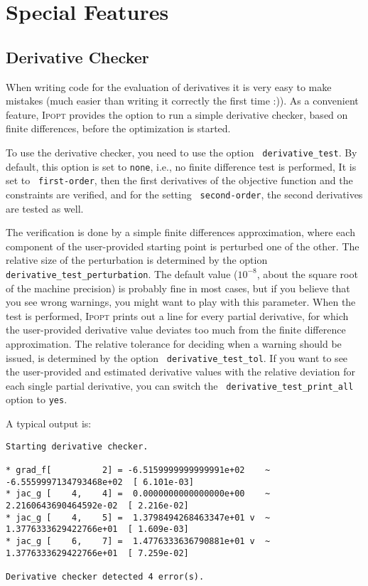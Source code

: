 \documentclass[10pt]{article}
\newcommand{\Ipopt}{\textsc{Ipopt}\xspace}
\begin{document}
\section{Special Features}
\subsection{Derivative Checker}\label{sec:deriv-checker}
When writing code for the evaluation of derivatives it is very easy to
make mistakes (much easier than writing it correctly the first time
:)).  As a convenient feature, \Ipopt provides the option to run a
simple derivative checker, based on finite differences, before the
optimization is started.

To use the derivative checker, you need to use the option {\tt
  derivative\_test}.  By default, this option is set to {\tt none},
i.e., no finite difference test is performed,  It is set to {\tt
  first-order}, then the first derivatives of the objective function
and the constraints are verified, and for the setting {\tt
  second-order}, the second derivatives are tested as well.

The verification is done by a simple finite differences approximation,
where each component of the user-provided starting point is perturbed
one of the other.  The relative size of the perturbation is determined
by the option {\tt derivative\_test\_perturbation}.  The default value
($10^{-8}$, about the square root of the machine precision) is
probably fine in most cases, but if you believe that you see wrong
warnings, you might want to play with this parameter.  When the test is
performed, \Ipopt prints out a line for every partial derivative, for
which the user-provided derivative value deviates too much from the
finite difference approximation.  The relative tolerance for deciding
when a warning should be issued, is determined by the option {\tt
  derivative\_test\_tol}.  If you want to see the user-provided and
estimated derivative values with the relative deviation for each
single partial derivative, you can switch the {\tt
  derivative\_test\_print\_all} option to {\tt yes}.

A typical output is:

\begin{footnotesize}
\begin{verbatim}
Starting derivative checker.

* grad_f[          2] = -6.5159999999999991e+02    ~ -6.5559997134793468e+02  [ 6.101e-03]
* jac_g [    4,    4] =  0.0000000000000000e+00    ~  2.2160643690464592e-02  [ 2.216e-02]
* jac_g [    4,    5] =  1.3798494268463347e+01 v  ~  1.3776333629422766e+01  [ 1.609e-03]
* jac_g [    6,    7] =  1.4776333636790881e+01 v  ~  1.3776333629422766e+01  [ 7.259e-02]

Derivative checker detected 4 error(s).
\end{verbatim}
\end{footnotesize}
\end{document}
